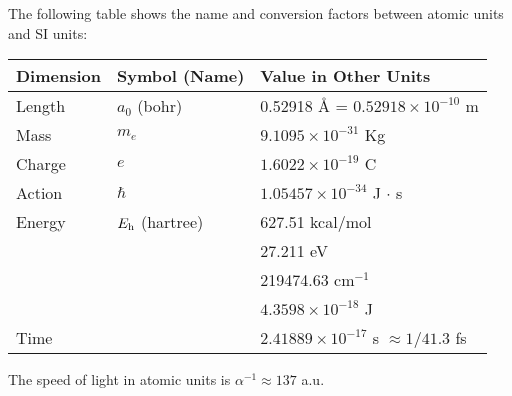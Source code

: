 \documentclass[../Main/notes.tex]{subfiles}
\begin{document}
The following table shows the name and conversion factors between atomic units and SI units:
\begin{table}[htbp]
\centering
\begin{tabular}{lll}
\toprule
Dimension & Symbol (Name) & Value in Other Units\\
\midrule
Length & $a_0$ (bohr) & 0.52918 \AA{}  = $0.52918 \times 10^{-10}$ m\\ 
Mass & $m_e$ & $9.1095 \times 10^{-31}$ Kg \\
Charge & $e$ & $1.6022 \times 10^{-19}$ C \\
Action & $\hbar$ & $1.05457 \times 10^{-34}$ J $\cdot$ s \\
Energy & $E_{\rm h}$ (hartree) & 627.51 kcal/mol \\
& & 27.211 eV \\
& & 219474.63 cm$^{-1}$ \\
& & $4.3598 \times 10^{-18}$ J\\
Time & & $2.41889 \times 10^{-17}$ s $\approx 1/41.3$ fs\\
\bottomrule
\end{tabular}
\label{tab:atomicunits}
\end{table}

The speed of light in atomic units is $\alpha^{-1}\approx 137$ a.u.
\end{document}
